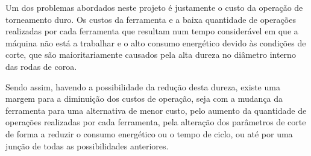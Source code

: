 \par
Um dos problemas abordados neste projeto é justamente o custo da operação de torneamento duro. Os custos da ferramenta e a baixa quantidade de operações realizadas por cada ferramenta que resultam num tempo considerável em que a máquina não está a trabalhar e o alto consumo energético devido às condições de corte, que são maioritariamente causados pela alta dureza no diâmetro interno das rodas de coroa. 
\par
Sendo assim, havendo a possibilidade da redução desta dureza, existe uma margem para a diminuição dos custos de operação, seja com a mudança da ferramenta para uma alternativa de menor custo, pelo aumento da quantidade de operações realizadas por cada ferramenta, pela alteração dos parâmetros de corte de forma a reduzir o consumo energético ou o tempo de ciclo, ou até por uma junção de todas as possibilidades anteriores.
